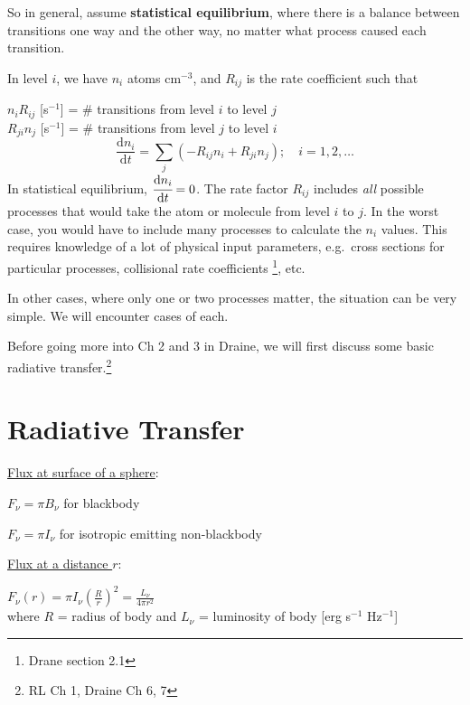 \documentclass[12pt]{article}
\begin{document}
So in general, assume \textbf{statistical equilibrium}, where there is
a balance between transitions one way and the other way, no matter
what process caused each transition.

In level $i$, we have $n_{i}$ atoms cm$^{-3}$, and
$R_{ij}$ is the rate coefficient such that

$n_{i}R_{ij}$ [s$^{-1}$] = \# transitions from level $i$ to level $j$\\
$R_{ji}n_{j}$ [s$^{-1}$] = \# transitions from level $j$ to level $i$\\

$${ \frac{\mathrm{d}n_{i}}{\mathrm{d}t} =
    \sum_{j}\left(-R_{ij}n_{i} + R_{ji}n_{j}\right);\quad i=1,2,\ldots
}$$
In statistical equilibrium,
$\cfrac{\mathrm{d}n_{i}}{\mathrm{d}t} = 0$. The rate factor $R_{ij}$
includes \emph{all} possible processes that would take the atom or
molecule from level $i$ to $j$. In the worst case, you would have to
include many processes to calculate the $n_{i}$ values. This requires
knowledge of a lot of physical input parameters, e.g.\ cross sections
for particular processes, collisional rate coefficients
\footnote{Drane section 2.1}, etc.

In other cases, where only one or two processes matter, the situation
can be very simple. We will encounter cases of each.

Before going more into Ch 2 and 3 in Draine, we will first discuss
some basic radiative transfer.\footnote{RL Ch 1, Draine Ch 6, 7}

\section{Radiative Transfer}
\begin{minipage}{0.45\textwidth}
    \underline{Flux at surface of a sphere}:
    \begin{list}{}
    \item $F_{\nu} = \pi{B_{\nu}}$ for blackbody
    \item $F_{\nu} = \pi{I_{\nu}}$ for isotropic emitting non-blackbody
    \end{list}
\end{minipage}
\hfill\begin{minipage}{0.45\textwidth}
    \underline{Flux at a distance $r$}:
    \begin{list}{}
    \item $F_{\nu}(r) = \pi{I_{\nu}}(\frac{R}{r})^{2}
        = \frac{L_{\nu}}{4\pi{r^{2}}}   $\\
        where $R$ = radius of body and $L_{\nu}$ = luminosity of body
        [erg s$^{-1}$ Hz$^{-1}$]
    \end{list}
\end{minipage}
\end{document}
